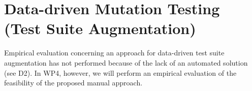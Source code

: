 \clearpage
\section{Data-driven Mutation Testing (Test Suite Augmentation)}
\label{sec:testGeneration:dataDriven}

Empirical evaluation concerning an approach for data-driven test suite augmentation has not performed because of the lack of an automated solution (see D2). In WP4, however, we will perform an empirical evaluation of the feasibility of the proposed manual approach.
